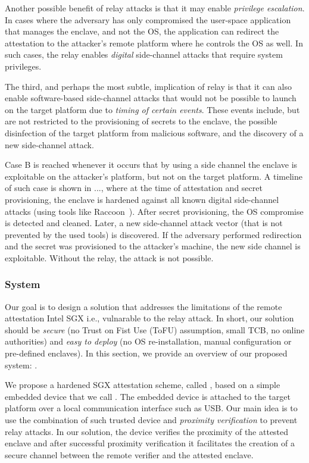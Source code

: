 Another possible benefit of relay attacks is that it may enable \emph{privilege escalation}. In cases where the adversary has only compromised the user-space application that manages the enclave, and not the OS, the application can redirect the attestation to the attacker's remote platform where he controls the OS as well. In such cases, the relay enables \emph{digital} side-channel attacks that require system privileges.

The third, and perhaps the most subtle, implication of relay is that it can also enable software-based side-channel attacks that would not be possible to launch on the target platform due to \emph{timing of certain events}. These events include, but are not restricted to the provisioning of secrets to the enclave, the possible disinfection of the target platform from malicious software, and the discovery of a new side-channel attack. 

Case B is reached whenever it occurs that by using a side channel the enclave is exploitable on the attacker's platform, but not on the target platform. A timeline of such case is shown in ..., where at the time of attestation and secret provisioning, the enclave is hardened against all known digital side-channel attacks (using tools like Raccoon~\cite{raccoon}). After secret provisioning, the OS compromise is detected and cleaned. Later, a new side-channel attack vector (that is not prevented by the used tools) is discovered. If the adversary performed redirection and the secret was provisioned to the attacker's machine, the new side channel is exploitable. Without the relay, the attack is not possible.


\subsubsection*{\proximitee System}

Our goal is to design a solution that addresses the limitations of the remote attestation Intel SGX i.e., vulnarable to the relay attack. In short, our solution should be \emph{secure} (no Trust on Fist Use (ToFU) assumption, small TCB, no online authorities) and \emph{easy to deploy} (no OS re-installation, manual configuration or pre-defined enclaves). In this section, we provide an overview of our proposed system: \proximitee.

We propose a hardened SGX attestation scheme, called \proximitee, based on a simple embedded device that we call \key. The embedded device is attached to the target platform over a local communication interface such as USB. 
Our main idea is to use the combination of such trusted device and \emph{proximity verification} to prevent relay attacks. In our solution, the \key device verifies the proximity of the attested enclave and after successful proximity verification it facilitates the creation of a secure channel between the remote verifier and the attested enclave. 

